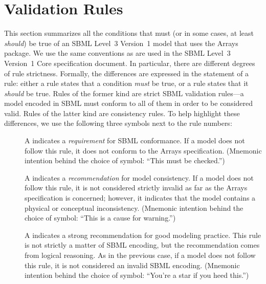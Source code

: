 \newcommand{\printValid}{\validRule{arrays-\arabic{arraysCtr}\addtocounter{arraysCtr}{1}}}
\newcommand{\printModeling}{\modelingRule{arrays-\arabic{arraysCtr}\addtocounter{arraysCtr}{1}}}

\section{Validation Rules}
\label{validation}

This section summarizes all the conditions that must (or in some cases,
at least \emph{should}) be true of an SBML Level~3 Version~1 model that
uses the Arrays package.  We use the same
conventions as are used in the SBML Level~3 Version~1 Core specification
document.  In particular, there are different degrees of rule
strictness.  Formally, the differences are expressed in the statement of
a rule: either a rule states that a condition \emph{must} be true, or a
rule states that it \emph{should} be true.  Rules of the former kind are
strict SBML validation rules---a model encoded in SBML must conform to
all of them in order to be considered valid.  Rules of the latter kind
are consistency rules.  To help highlight these differences, we use the
following three symbols next to the rule numbers:

\begin{description}

\item[\hspace*{6.5pt}\vSymbol\vsp] A \vSymbolName indicates a
  \emph{requirement} for SBML conformance. If a model does not follow
  this rule, it does not conform to the Arrays
  specification.  (Mnemonic intention behind the choice of symbol:
  ``This must be checked.'')

\item[\hspace*{6.5pt}\cSymbol\csp] A \cSymbolName indicates a
  \emph{recommendation} for model consistency.  If a model does not
  follow this rule, it is not considered strictly invalid as far as the
  Arrays specification is concerned; however, it
  indicates that the model contains a physical or conceptual
  inconsistency.  (Mnemonic intention behind the choice of symbol:
  ``This is a cause for warning.'')

\item[\hspace*{6.5pt}\mSymbol\msp] A \mSymbolName indicates a strong
  recommendation for good modeling practice.  This rule is not strictly
  a matter of SBML encoding, but the recommendation comes from logical
  reasoning.  As in the previous case, if a model does not follow this
  rule, it is not considered an invalid SBML encoding.  (Mnemonic
  intention behind the choice of symbol: ``You're a star if you heed
  this.'')

\end{description}

